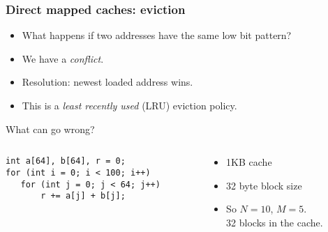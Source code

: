 \documentclass[presentation,aspectratio=43,10pt]{beamer}
\begin{document}
\begin{frame}[fragile]
  \frametitle{Direct mapped caches: eviction}
  \begin{itemize}
  \item What happens if two addresses have the same low bit pattern?
  \item We have a \emph{conflict}.
  \item Resolution: newest loaded address wins.
  \item This is a \emph{least recently used} (LRU) eviction policy.
  \end{itemize}

  \begin{block}{What can go wrong?}
    \begin{columns}
      \begin{column}{0.45\textwidth}
\begin{verbatim}
int a[64], b[64], r = 0;
for (int i = 0; i < 100; i++)
   for (int j = 0; j < 64; j++)
       r += a[j] + b[j];
\end{verbatim}
      \end{column}
      \begin{column}{0.45\textwidth}
        \begin{itemize}
        \item 1KB cache
        \item 32 byte block size
        \item So $N=10$, $M=5$.\\
          32 blocks in the cache.
        \end{itemize}
      \end{column}
    \end{columns}
  \end{block}
\end{frame}
\end{document}
